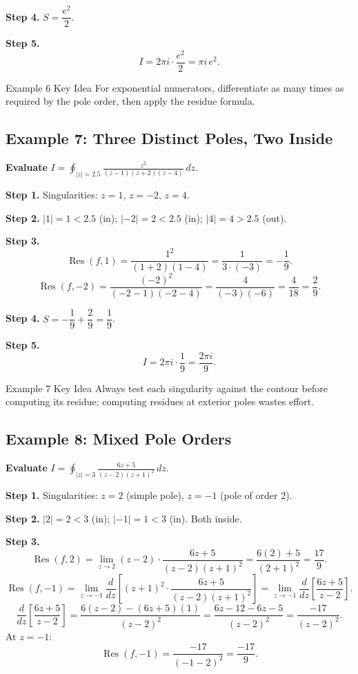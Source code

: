 \documentclass[12pt,a4paper]{article}
\begin{document}
\textbf{Step 4.} $S = \dfrac{e^2}{2}$.

\textbf{Step 5.}
\[
  I = 2\pi i \cdot \frac{e^2}{2} = \boxed{\pi i\,e^2}.
\]

\begin{learnbox}{Example 6 Key Idea}
For exponential numerators, differentiate as many times as required by the pole
order, then apply the residue formula.
\end{learnbox}

\subsection*{Example 7: Three Distinct Poles, Two Inside}

\textbf{Evaluate} $\displaystyle I = \oint_{|z|=2.5}
  \frac{z^2}{(z-1)(z+2)(z-4)}\,dz$.

\textbf{Step 1.} Singularities: $z=1$, $z=-2$, $z=4$.

\textbf{Step 2.} $|1|=1<2.5$ (in); $|-2|=2<2.5$ (in); $|4|=4>2.5$ (out).

\textbf{Step 3.}
\[
  \operatorname{Res}(f,1)
  = \frac{1^2}{(1+2)(1-4)} = \frac{1}{3\cdot(-3)} = -\frac{1}{9}.
\]
\[
  \operatorname{Res}(f,-2)
  = \frac{(-2)^2}{(-2-1)(-2-4)} = \frac{4}{(-3)(-6)} = \frac{4}{18} = \frac{2}{9}.
\]

\textbf{Step 4.} $S = -\dfrac{1}{9} + \dfrac{2}{9} = \dfrac{1}{9}$.

\textbf{Step 5.}
\[
  I = 2\pi i \cdot \frac{1}{9} = \boxed{\frac{2\pi i}{9}}.
\]

\begin{learnbox}{Example 7 Key Idea}
Always test each singularity against the contour before computing its residue;
computing residues at exterior poles wastes effort.
\end{learnbox}

\subsection*{Example 8: Mixed Pole Orders}

\textbf{Evaluate} $\displaystyle I = \oint_{|z|=3}
  \frac{6z+5}{(z-2)(z+1)^2}\,dz$.

\textbf{Step 1.} Singularities: $z=2$ (simple pole), $z=-1$ (pole of order 2).

\textbf{Step 2.} $|2|=2<3$ (in); $|-1|=1<3$ (in). Both inside.

\textbf{Step 3.}
\[
  \operatorname{Res}(f,2)
  = \lim_{z\to 2}(z-2)\cdot\frac{6z+5}{(z-2)(z+1)^2}
  = \frac{6(2)+5}{(2+1)^2} = \frac{17}{9}.
\]
\[
  \operatorname{Res}(f,-1)
  = \lim_{z\to -1}\frac{d}{dz}\!\left[(z+1)^2\cdot\frac{6z+5}{(z-2)(z+1)^2}\right]
  = \lim_{z\to -1}\frac{d}{dz}\!\left[\frac{6z+5}{z-2}\right].
\]
\[
  \frac{d}{dz}\!\left[\frac{6z+5}{z-2}\right]
  = \frac{6(z-2)-(6z+5)(1)}{(z-2)^2}
  = \frac{6z-12-6z-5}{(z-2)^2}
  = \frac{-17}{(z-2)^2}.
\]
At $z=-1$:
\[
  \operatorname{Res}(f,-1) = \frac{-17}{(-1-2)^2} = \frac{-17}{9}.
\]
\end{document}
